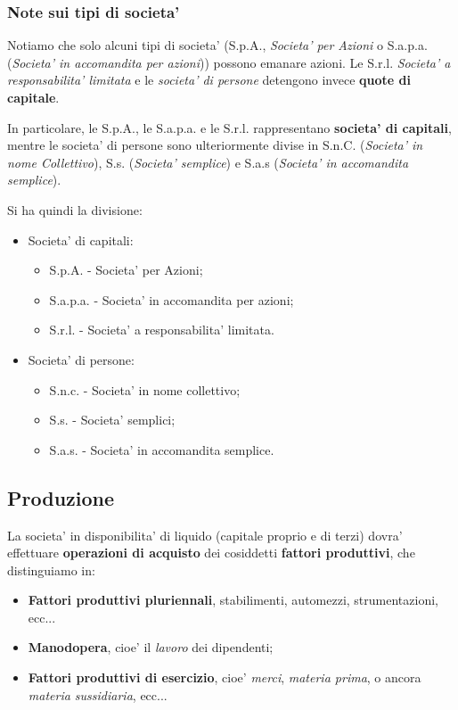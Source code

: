 \documentclass[a4paper,11pt]{article}
\begin{document}
\subsubsection{Note sui tipi di societa'}
Notiamo che solo alcuni tipi di societa' (S.p.A., \textit{Societa' per Azioni} o S.a.p.a. (\textit{Societa' in accomandita per azioni})) possono emanare azioni.
Le S.r.l. \textit{Societa' a responsabilita' limitata} e le \textit{societa' di persone} detengono invece \textbf{quote di capitale}.

In particolare, le S.p.A., le S.a.p.a. e le S.r.l. rappresentano \textbf{societa' di capitali}, mentre le societa' di persone sono ulteriormente divise in S.n.C. (\textit{Societa' in nome Collettivo}), S.s. (\textit{Societa' semplice}) e S.a.s (\textit{Societa' in accomandita semplice}).

Si ha quindi la divisione:
\begin{itemize}
	\item Societa' di capitali:
		\begin{itemize}
			\item S.p.A. - Societa' per Azioni;
			\item S.a.p.a. - Societa' in accomandita per azioni;
			\item S.r.l. - Societa' a responsabilita' limitata.
		\end{itemize}
	\item Societa' di persone:
		\begin{itemize}
			\item S.n.c. - Societa' in nome collettivo;
			\item S.s. - Societa' semplici;
			\item S.a.s. - Societa' in accomandita semplice.
		\end{itemize}
\end{itemize}

\subsection{Produzione}
La societa' in disponibilita' di liquido (capitale proprio e di terzi) dovra' effettuare \textbf{operazioni di acquisto} dei cosiddetti \textbf{fattori produttivi}, che distinguiamo in:
\begin{itemize}
	\item \textbf{Fattori produttivi pluriennali}, stabilimenti, automezzi, strumentazioni, ecc...
	\item \textbf{Manodopera}, cioe' il \textit{lavoro} dei dipendenti;
		\item \textbf{Fattori produttivi di esercizio}, cioe' \textit{merci}, \textit{materia prima}, o ancora \textit{materia sussidiaria}, ecc...
\end{itemize}
\end{document}
